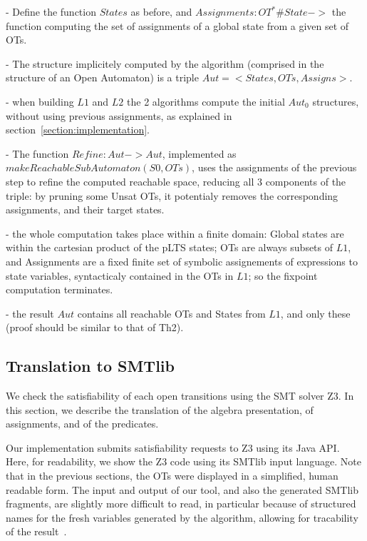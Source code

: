 \documentclass[smallcondensed]{svjour3}
\newcommand{\noteInEM}[2][inline,color=green!40]{\todo[#1]{{\bf Eric: } {#2}}}
\begin{document}
  - Define the function $States$ as before, and  $Assignments : OT^* \# State -> $ the function
  computing the set of assignments of a global state from a given set of OTs.

  - The structure implicitely computed by the algorithm (comprised in
  the structure of an Open Automaton) is a triple $ Aut= <States, OTs,
  Assigns>$.

  - when building $L1$ and $L2$ the 2 algorithms compute the initial
  $Aut_0$ structures, without using previous assignments, as
  explained in section~\ref{section:implementation}.
  
  - The function $Refine : Aut->Aut$, implemented as
  $makeReachableSubAutomaton(S0,OTs)$, uses the assignments of the
  previous step to refine the computed reachable space, reducing all 3
  components of the triple: by pruning some Unsat OTs, it potentialy
  removes the corresponding assignments, and their target states.

  - the whole computation takes place within a finite domain: Global
  states are within the cartesian product of the pLTS states; OTs are
  always subsets of $L1$, and Assignments are a fixed finite set of
  symbolic assignements of expressions to state variables,
  syntacticaly contained in the OTs in $L1$; so the fixpoint
  computation terminates.

  - the result $Aut$ contains all reachable OTs and States from $L1$,
  and only these (proof should be similar to that of Th2).


\subsection{Translation to SMTlib}
\label{section:TranslationToSMTlib}

We check the satisfiability of each open transitions
using the SMT solver Z3.
In this
section, we describe the translation of the algebra presentation, of
assignments, and of the predicates.

Our implementation submits satisfiability requests to
Z3 using its Java API. Here, for readability, we
show the Z3 code using its SMTlib input language.
Note that in the previous sections, the OTs were displayed in a
simplified, human readable form. The input and output of our tool, and
also the generated SMTlib fragments, are
slightly more difficult to read, in 
particular because of structured names for the fresh variables generated
by the algorithm, allowing for tracability of the result~\cite{Avocs-RR}.
\end{document}
